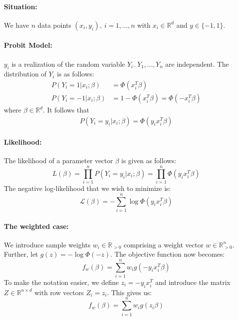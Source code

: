 \paragraph{Situation:}
We have $n$ data points $(x_i, y_i), \ i=1,...,n$ with
$x_i \in \mathbb{R}^d$ and $y \in \{ -1, 1\}$.

\paragraph{Probit Model:}
$y_i$ is a realization of the random variable $Y_i$.
$Y_1, ..., Y_n$ are independent.
The distribution of $Y_i$ is as follows:
\begin{align*}
    P(Y_i = 1 | x_i; \beta)  & = \Phi(x_i^T \beta)                          \\
    P(Y_i = -1 | x_i; \beta) & = 1 - \Phi(x_i^T \beta) = \Phi(-x_i^T \beta)
\end{align*}
where $\beta \in \mathbb{R}^d$.
It follows that
\begin{align*}
    P(Y_i = y_i | x_i; \beta) = \Phi(y_i x_i^T \beta)
\end{align*}

\paragraph{Likelihood:}
The likelihood of a parameter vector $\beta$ is given as follows:
\begin{equation*}
    L(\beta) = \prod_{i=1}^n P(Y_i = y_i | x_i; \beta) = \prod_{i=1}^n \Phi(y_i x_i^T \beta)
\end{equation*}
The negative log-likelihood that we wish to minimize is:
\begin{equation*}
    \mathcal{L}(\beta) = -\sum_{i=1}^n \log \Phi(y_i x_i^T \beta)
\end{equation*}

\paragraph{The weighted case:}
We introduce sample weights $w_i \in \mathbb{R}_{>0}$
comprising a weight vector $w \in \mathbb{R}_{>0}^n$.
Further, let $g(z) = -\log \Phi(-z)$.
The objective function now becomes:
\begin{equation*}
    f_w(\beta) = \sum_{i=1}^n w_i g(-y_i x_i^T \beta)
\end{equation*}
To make the notation easier, we define $z_i = -y_i x_i^T$ and introduce
the matrix $Z \in \mathbb{R}^{n \times d}$ with row vectors $Z_i = z_i$.
This gives us:
\begin{equation*}
    f_w(\beta) = \sum_{i=1}^n w_i g(z_i \beta)
\end{equation*}

